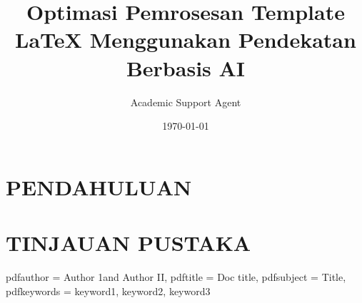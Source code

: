 \documentclass{report}
\title{Optimasi Pemrosesan Template LaTeX Menggunakan Pendekatan Berbasis AI}
\author{Academic Support Agent}
\date{\today}
\begin{document}
\maketitle

\begin{abstract}

\end{abstract}

\chapter{PENDAHULUAN}


\chapter{TINJAUAN PUSTAKA}



\usepackage{Packages}
\usepackage[framed,numbered,autolinebreaks,useliterate]{Listings}

\addto\captionsbritish{\renewcommand{\contentsname}{Table of Contents}}


\newcommand{\researchgroup}{Experimental Physics 3}

\newcommand{\shortdoctitle}{Doc title}
\newcommand{\doctitle}{Title}
\newcommand{\docsubtitle}{}

\newcommand{\authorone}{Author 1}
\newcommand{\sauthorone}{s-number I}
\newcommand{\authortwo}{Author II}
\newcommand{\sauthortwo}{s-number II}
\newcommand{\keywords}{keyword1, keyword2, keyword3}
\newcommand{\version}{First version}
\newcommand{\monthYear}{MONTH 2019}

\newcommand{\firstCommitteeMember}{NAME PRACTICUM SUPERVISOR}
\newcommand{\secondCommitteeMember}{}
\newcommand{\thirdCommitteeMember}{}

\author{\me}

\hypersetup
{
    pdfauthor   = {\authorone and \authortwo},
    pdftitle    = {\shortdoctitle},
    pdfsubject  = {\doctitle},
    pdfkeywords = {\keywords}
}
\end{document}
